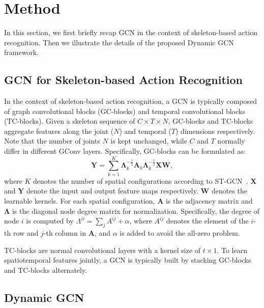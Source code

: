\documentclass[sigconf]{acmart}
\begin{document}
\section{Method}
In this section, we first briefly recap GCN in the context of skeleton-based action recognition. Then we illustrate the details of the proposed Dynamic GCN framework.

\subsection{GCN for Skeleton-based Action Recognition}



In the context of skeleton-based action recognition, a GCN is typically composed of graph convolutional blocks (GC-blocks) and temporal convolutional blocks (TC-blocks). Given a skeleton sequence of $C \times T \times N$, GC-blocks and TC-blocks aggregate features along the joint ($N$) and temporal ($T$) dimensions respectively. Note that the number of joints $N$ is kept unchanged, while $C$ and $T$ normally differ in different GConv layers. Specifically, GC-blocks can be formulated as:
\begin{equation}
 {{\mathbf{Y}}} = \sum\limits_{k = 1}^K {{\mathbf{\Lambda }}_k^{ - \frac{1}{2}}{{\mathbf{A}}_{k}}} {\mathbf{\Lambda }}_k^{ - \frac{1}{2}}{\mathbf{XW}},
 \label{eq1}
 \end{equation}
where $K$ denotes the number of spatial configurations according to ST-GCN~\cite{yanspatial}. $\mathbf{X}$ and $\mathbf{Y}$ denote the input and output feature maps respectively. ${\mathbf{W}}$ denotes the learnable kernels. For each spatial configuration, ${\mathbf{A}}$ is the adjacency matrix and ${\mathbf{\Lambda}}$ is the diagonal node degree matrix for normalization. Specifically, the degree of node $i$ is computed by $\Lambda^{ii} = \sum\nolimits_j {A^{ij}} + \alpha $, where ${A^{ij}}$ denotes the element of the $i$-th row and $j$-th column in $\mathbf{A}$, and $\alpha$ is added to avoid the all-zero problem.

TC-blocks are normal convolutional layers with a kernel size of $t \times 1$. To learn spatiotemporal features jointly, a GCN is typically built by stacking GC-blocks and TC-blocks alternately.



\subsection{Dynamic GCN}
\end{document}
